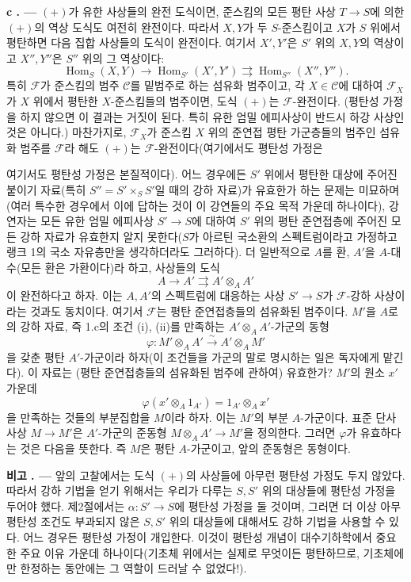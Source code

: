 \documentclass[11pt,twoside,openany]{book}
\numberwithin{equation}{section}
\newcommand{\sourceunit}{front}
\newcommand{\src}[1]{%
  \phantomsection\hypertarget{src:\sourceunit:#1}{}%
  \marginpar{\raggedleft\footnotesize\sffamily #1}%
}
\theoremstyle{plain}
\theoremstyle{definition}
\theoremstyle{remark}
\newcommand{\result}[2]{%
  \par\medskip\noindent\textbf{#1%
  \if\relax\detokenize{#2}\relax\else\space#2\fi. ---}\enspace
}
\begin{document}
\result{c}{} $(+)$가 유한 사상들의 완전 도식이면, 준스킴의 모든 평탄
사상 $T\longrightarrow S$에 의한 $(+)$의 역상 도식도 여전히 완전이다.
따라서 $X,Y$가 두 $S$-준스킴이고 $X$가 $S$ 위에서 평탄하면 다음
집합 사상들의 도식이 완전이다. 여기서 $X',Y'$은 $S'$ 위의 $X,Y$의
역상이고 $X'',Y''$은 $S''$ 위의 그 역상이다:
\[
  \operatorname{Hom}_S(X,Y)\longrightarrow
  \operatorname{Hom}_{S'}(X',Y')
  \rightrightarrows
  \operatorname{Hom}_{S''}(X'',Y'').
\]
특히 $\mathcal F$가 준스킴의 범주 $\mathcal C$를 밑범주로 하는
섬유화 범주이고, 각 $X\in\mathcal C$에 대하여 $\mathcal F_X$가
$X$ 위에서 평탄한 $X$-준스킴들의 범주이면, 도식 $(+)$는
$\mathcal F$-완전이다. (평탄성 가정을 하지 않으면 이 결과는 거짓이
된다. 특히 유한 엄밀 에피사상이 반드시 하강 사상인 것은 아니다.)
마찬가지로, $\mathcal F_X$가 준스킴 $X$ 위의 준연접 평탄 가군층들의
범주인 섬유화 범주를 $\mathcal F$라 해도 $(+)$는
$\mathcal F$-완전이다(여기에서도 평탄성 가정은

\src{307}
여기서도 평탄성 가정은 본질적이다). 어느 경우에든 $S'$ 위에서 평탄한
대상에 주어진 붙이기 자료(특히 $S''=S'\times_SS'$일 때의 강하 자료)가
유효한가 하는 문제는 미묘하며(여러 특수한 경우에서 이에 답하는 것이 이
강연들의 주요 목적 가운데 하나이다), 강연자는 모든 유한 엄밀 에피사상
$S'\longrightarrow S$에 대하여 $S'$ 위의 평탄 준연접층에 주어진 모든 강하
자료가 유효한지 알지 못한다($S$가 아르틴 국소환의 스펙트럼이라고 가정하고
랭크 1의 국소 자유층만을 생각하더라도 그러하다). 더 일반적으로 $A$를 환,
$A'$을 $A$-대수(모든 환은 가환이다)라 하고, 사상들의 도식
\[
  A\longrightarrow A'\rightrightarrows A'\otimes_AA'
\]
이 완전하다고 하자. 이는 $A,A'$의 스펙트럼에 대응하는 사상
$S'\longrightarrow S$가 $\mathcal F$-강하 사상이라는 것과도 동치이다.
여기서 $\mathcal F$는 평탄 준연접층들의 섬유화된 범주이다. $M'$을 $A$로의
강하 자료, 즉 1.c의 조건 (i), (ii)를 만족하는 $A'\otimes_AA'$-가군의 동형
\[
  \varphi:M'\otimes_AA'\xrightarrow{\sim}A'\otimes_AM'
\]
을 갖춘 평탄 $A'$-가군이라 하자(이 조건들을 가군의 말로 명시하는 일은
독자에게 맡긴다). 이 자료는 (평탄 준연접층들의 섬유화된 범주에 관하여)
유효한가? $M'$의 원소 $x'$ 가운데
\[
  \varphi(x'\otimes_A1_{A'})=1_{A'}\otimes_Ax'
\]
을 만족하는 것들의 부분집합을 $M$이라 하자. 이는 $M'$의 부분
$A$-가군이다. 표준 단사사상 $M\longrightarrow M'$은 $A'$-가군의 준동형
$M\otimes_AA'\longrightarrow M'$을 정의한다. 그러면 $\varphi$가
유효하다는 것은 다음을 뜻한다. 즉 $M$은 평탄 $A$-가군이고, 앞의
준동형은 동형이다.

\result{비고}{} 앞의 고찰에서는 도식 $(+)$의 사상들에 아무런 평탄성
가정도 두지 않았다. 따라서 강하 기법을 얻기 위해서는 우리가 다루는
$S,S'$ 위의 대상들에 평탄성 가정을 두어야 했다. 제2절에서는
$\alpha:S'\longrightarrow S$에 평탄성 가정을 둘 것이며, 그러면 더 이상
아무 평탄성 조건도 부과되지 않은 $S,S'$ 위의 대상들에 대해서도 강하
기법을 사용할 수 있다. 어느 경우든 평탄성 가정이 개입한다. 이것이
평탄성 개념이 대수기하학에서 중요한 주요 이유 가운데 하나이다(기초체
위에서는 실제로 무엇이든 평탄하므로, 기초체에만 한정하는 동안에는 그
역할이 드러날 수 없었다!).
\end{document}
